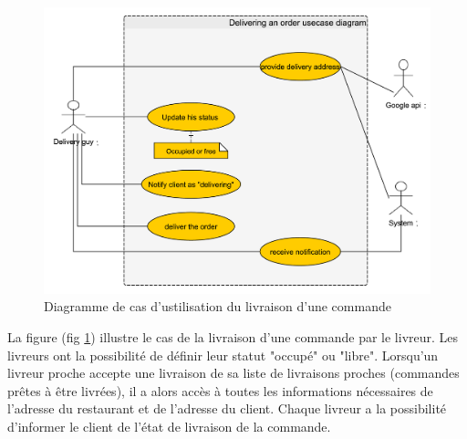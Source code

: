 \documentclass[french, a4paper, 12pt]{report}
\begin{document}
			\newpage
			\begin{figure}[!h]
  				\center
  				\includegraphics[width=15cm]{usecasedeliver.png}
  				\caption{Diagramme de cas d'ustilisation du livraison d'une commande}
  				\label{fig:usecasedeliver}
			\end{figure}
			La figure (fig \ref{fig:usecasedeliver}) illustre le cas de la livraison d'une commande par le livreur. Les livreurs ont la possibilité de définir leur statut "occupé" ou "libre". Lorsqu'un livreur proche accepte une livraison de sa liste de livraisons proches (commandes prêtes à être livrées), il a alors accès à toutes les informations nécessaires de l'adresse du restaurant et de l'adresse du client.
Chaque livreur a la possibilité d'informer le client de l'état de livraison de la commande.
			
			
			\newpage
\end{document}
